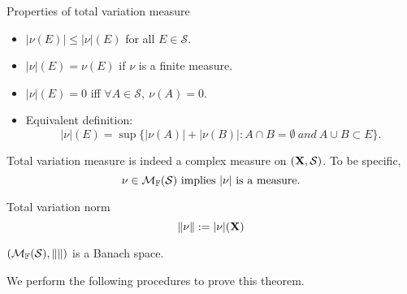 \begin{stheorem}{Properties of total variation measure}{}
\begin{itemize}
	\item $|\nu(E)| \leq |\nu|(E)$ for all $E \in \mathcal S$.
	\item $|\nu|(E) = \nu(E)$ if $\nu$ is a finite measure.
	\item $|\nu|(E) = 0$ iff $\forall A\in \mathcal S, \ \nu(A)=0$.
	\item Equivalent definition: $$|\nu|(E)=\sup\{|\nu(A)|+|\nu(B)|: A\cap B=\emptyset \ and \ A \cup B \subset E \}.$$
\end{itemize}
\end{stheorem}

\begin{stheorem}{}{}
Total variation measure is indeed a complex measure on $(\mathbf{X},\mathcal S)$. To be specific,
$$\nu \in \M_\F(\mathcal S) \ \text{implies} \ |\nu| \ \text{is a measure}.$$
\end{stheorem}

\begin{sdefinition}{Total variation norm}{}
$$
\Vert \nu \Vert := |\nu|(\mathbf{X})
$$
\end{sdefinition}

\begin{stheorem}{}{}
$(\mathcal{M}_{\mathbb{F}}(\mathcal S),\Vert\Vert)$ is a Banach space.	
\end{stheorem}
We perform the following procedures to prove this theorem.


